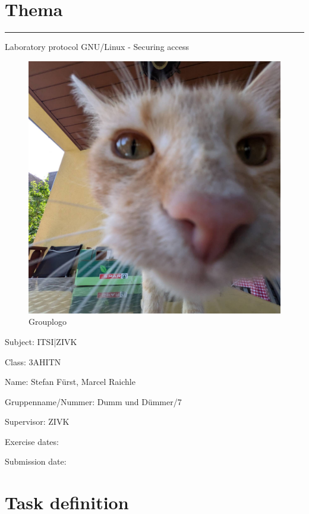 \documentclass[a4paper]{article}
\begin{document}

\pagestyle{oida}
\section*{Thema}
\par\noindent\rule{\textwidth}{0.4pt}

Laboratory protocol
GNU/Linux - Securing access

\begin{figure}[h]
	\includegraphics[scale=0.3]{images/mika.jpeg}
	\caption{Grouplogo}
\end{figure}

\vspace*{\fill}
Subject:	ITSI|ZIVK

Class:	3AHITN

Name:	Stefan Fürst, Marcel Raichle

Gruppenname/Nummer: Dumm und Dümmer/7

Supervisor: 	ZIVK

Exercise dates:	

Submission date:


\newpage
\tableofcontents

\newpage

\section{Task definition}
\end{document}
